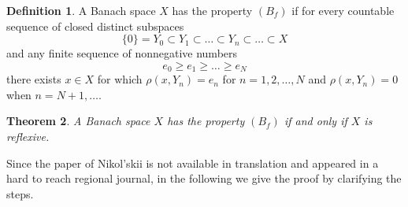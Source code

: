 \documentclass[12pt, reqno]{amsart}
\newtheorem{theorem}{Theorem}[section]
\theoremstyle{definition}
\newtheorem{definition}[theorem]{Definition}
\theoremstyle{remark}
\numberwithin{equation}{section}
\begin{document}
\begin{definition}\cite{Nik}
A Banach space $X$  has the property $(B_f)$ if for every countable sequence of closed  distinct subspaces 
$$\{0\} = Y_0\subset Y_1\subset \dots\subset Y_n\subset \dots\subset X$$ and any finite sequence of nonnegative numbers
$$ e_0\geq e_1\geq \dots\geq e_N$$ there exists $x\in X$ for which $\rho(x,Y_n)=e_n$ for $n=1,2,\dots, N$ and $\rho(x,Y_n)=0$ when $n=N+1,\dots$. 

\end{definition}
\begin{theorem}\cite{Nik}
\label{B_f}
A Banach space  $X$ has the property $(B_f)$ if and only if $X$ is reflexive. 
\end{theorem}
Since the paper   \cite{Nik}  of Nikol'skii is  not available  in translation and appeared in a hard to reach regional  journal, in the following we give the proof by clarifying the steps.
\end{document}

